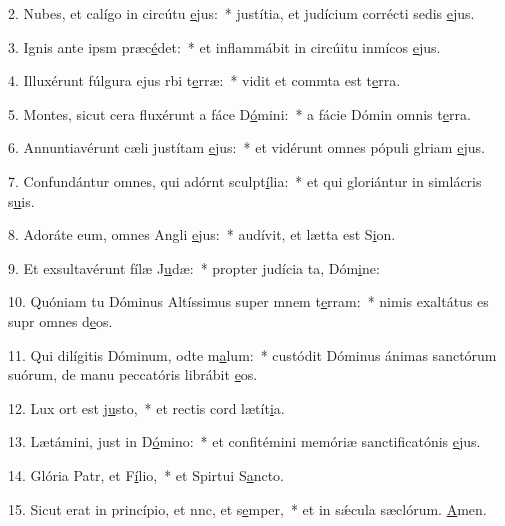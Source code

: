 2. Nubes, et calígo in circútu \uline{e}jus:~* justítia, et judícium corrécti sedis \uline{e}jus.\par 
3. Ignis ante ipsm præc\uline{é}det:~* et inflammábit in circúitu inmícos \uline{e}jus.\par 
4. Illuxérunt fúlgura ejus rbi t\uline{e}rræ:~* vidit et commta est t\uline{e}rra.\par 
5. Montes, sicut cera fluxérunt a fáce D\uline{ó}mini:~* a fácie Dómin omnis t\uline{e}rra.\par 
6. Annuntiavérunt cæli justítam \uline{e}jus:~* et vidérunt omnes pópuli glriam \uline{e}jus.\par 
7. Confundántur omnes, qui adórnt sculpt\uline{í}lia:~* et qui gloriántur in simlácris s\uline{u}is.\par 
8. Adoráte eum, omnes Angli \uline{e}jus:~* audívit, et lætta est S\uline{i}on.\par 
9. Et exsultavérunt fílæ J\uline{u}dæ:~* propter judícia ta, Dóm\uline{i}ne:\par 
10. Quóniam tu Dóminus Altíssimus super mnem t\uline{e}rram:~* nimis exaltátus es supr omnes d\uline{e}os.\par 
11. Qui dilígitis Dóminum, odte m\uline{a}lum:~* custódit Dóminus ánimas sanctórum suórum, de manu peccatóris librábit \uline{e}os.\par 
12. Lux ort est j\uline{u}sto,~* et rectis cord lætít\uline{i}a.\par 
13. Lætámini, just in D\uline{ó}mino:~* et confitémini memóriæ sanctificatónis \uline{e}jus.\par 
14. Glória Patr, et F\uline{í}lio,~* et Spirtui S\uline{a}ncto.\par 
15. Sicut erat in princípio, et nnc, et s\uline{e}mper,~* et in sǽcula sæclórum. \uline{A}men.\par 

